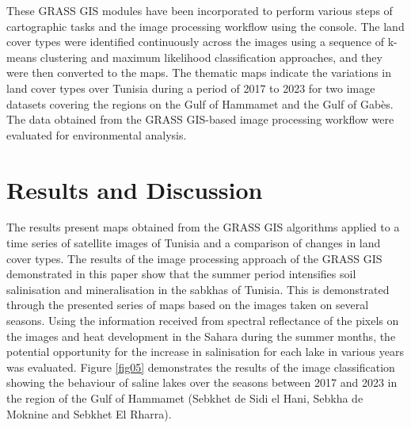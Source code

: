 \documentclass[land,article,accept,pdftex,moreauthors]{Definitions/mdpi}
\begin{document}
These GRASS GIS modules have been incorporated to perform various steps of cartographic tasks and the image processing workflow {using the} console. The land cover types were identified continuously across the images using a sequence of k-means clustering and maximum likelihood classification approaches, and they were then converted to the maps{. The thematic maps indicate }the variations in land cover types over Tunisia during a period of 2017 to 2023 for two image datasets covering the regions on the Gulf of Hammamet and the Gulf of Gabès. The data obtained from the GRASS GIS-based image processing workflow were evaluated for environmental analysis.

\section{Results and Discussion}

{The results present maps obtained from the GRASS GIS algorithms applied to a time series of satellite images of Tunisia and a comparison of changes in land cover types. }The results of the image processing approach of the GRASS GIS demonstrated in this paper show that the summer period {intensifies} soil salinisation and mineralisation in the sabkhas of Tunisia{. This is } demonstrated through {the presented }series of {maps based on the images taken} on several seasons{. Using} the information received from spectral reflectance of the pixels on the images and heat development in the Sahara during the summer months{, the potential opportunity for the increase in} salinisation for each lake in various years {was evaluated}. Figure \ref{fig05} demonstrates the results of the image classification showing the behaviour of saline lakes over the seasons between 2017 and 2023 in the region of the Gulf of Hammamet (Sebkhet de Sidi el Hani, Sebkha de Moknine and Sebkhet El Rharra). 
\end{document}
